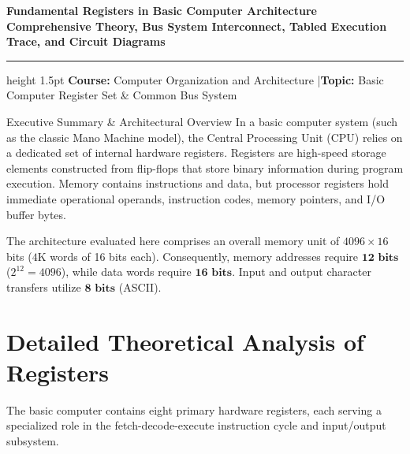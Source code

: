 \documentclass[11pt,a4paper]{article}
\begin{document}
\begin{center}
    {\LARGE \textbf{\textcolor{primaryblue}{Fundamental Registers in Basic Computer Architecture}}}\\[0.3cm]
    {\large \textbf{\textcolor{secondaryblue}{Comprehensive Theory, Bus System Interconnect, Tabled Execution Trace, and Circuit Diagrams}}}\\[0.2cm]
    \hrule height 1.5pt
    \vspace{0.3cm}
    {\small \textbf{Course:} Computer Organization and Architecture \quad|\quad \textbf{Topic:} Basic Computer Register Set \& Common Bus System}
    \vspace{0.3cm}
\end{center}

\begin{summarybox}{Executive Summary \& Architectural Overview}
In a basic computer system (such as the classic Mano Machine model), the Central Processing Unit (CPU) relies on a dedicated set of internal hardware registers. Registers are high-speed storage elements constructed from flip-flops that store binary information during program execution. Memory contains instructions and data, but processor registers hold immediate operational operands, instruction codes, memory pointers, and I/O buffer bytes. 

The architecture evaluated here comprises an overall memory unit of $4096 \times 16$ bits ($4\text{K}$ words of 16 bits each). Consequently, memory addresses require $\mathbf{12\text{ bits}}$ ($2^{12} = 4096$), while data words require $\mathbf{16\text{ bits}}$. Input and output character transfers utilize $\mathbf{8\text{ bits}}$ (ASCII).
\end{summarybox}

\vspace{0.2cm}

\section{\textcolor{primaryblue}{Detailed Theoretical Analysis of Registers}}

The basic computer contains eight primary hardware registers, each serving a specialized role in the fetch-decode-execute instruction cycle and input/output subsystem.
\end{document}
